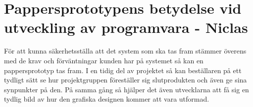 \chapter{Pappersprototypens betydelse vid utveckling av programvara - Niclas}
För att kunna säkerhetsställa att det system som ska tas fram stämmer överens med de krav och förväntningar kunden har på systemet så kan en pappersprototyp tas fram. I en tidig del av projektet så kan beställaren på ett tydligt sätt se hur projektgruppen föreställer sig slutprodukten och även ge sina synpunkter på den. På samma gång så hjälper det även utvecklarna att få sig en tydlig bild av hur den grafiska designen kommer att vara utformad.
